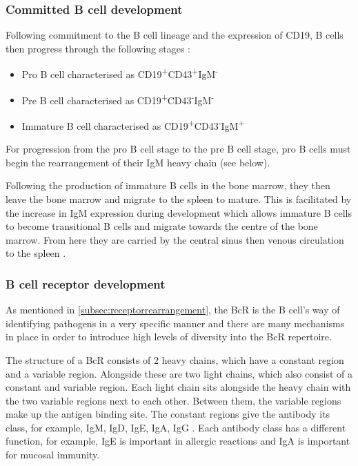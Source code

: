 \subsubsection{Committed B cell development}
\label{subsubsec:committedBcelldevelopment}

Following commitment to the B cell lineage and the expression of CD19, B cells then progress through the following stages \citep{Cambier2007}:
\begin{itemize}
\item Pro B cell characterised as CD19\textsuperscript{+}CD43\textsuperscript{+}IgM\textsuperscript{-}
\item Pre B cell characterised as CD19\textsuperscript{+}CD43\textsuperscript{-}IgM\textsuperscript{-}
\item Immature B cell characterised as CD19\textsuperscript{+}CD43\textsuperscript{-}IgM\textsuperscript{+}
\end{itemize}

For progression from the pro B cell stage to the pre B cell stage, pro B cells must begin the rearrangement of their IgM heavy chain (see below).

Following the production of immature B cells in the bone marrow, they then leave the bone marrow and migrate to the spleen to mature.
This is facilitated by the increase in IgM expression during development which allows immature B cells to become transitional B cells and migrate towards the centre of the bone marrow. 
From here they are carried by the central sinus then venous circulation to the spleen \citep{Loder1999}.


\subsubsection{B cell receptor development}
\label{subsubsec:Bcellrecepdevelopment}

As mentioned in \cref{subsec:receptorrearrangement}, the BcR is the B cell's way of identifying pathogens in a very specific manner and there are many mechanisms in place in order to introduce high levels of diversity into the BcR repertoire.

The structure of a BcR consists of 2 heavy chains, which have a constant region and a variable region.
Alongside these are two light chains, which also consist of a constant and variable region.
Each light chain sits alongside the heavy chain with the two variable regions next to each other.
Between them, the variable regions make up the antigen binding site.
The constant regions give the antibody its class, for example, IgM, IgD, IgE, IgA, IgG \citep{Pieper2013}.
Each antibody class has a different function, for example, IgE is important in allergic reactions and IgA is important for mucosal immunity.

